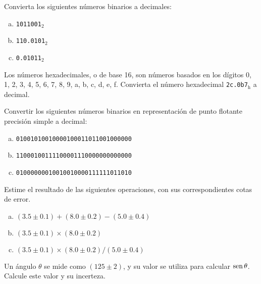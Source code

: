 \documentclass[11pt]{article}
\begin{document}
\begin{question} %
Convierta los siguientes números binarios a decimales:
\begin{enumerate}[a)]
    \item \texttt{1011001}$_2$
    \item \texttt{110.0101}$_2$
    \item \texttt{0.01011}$_2$
\end{enumerate}
\end{question}

\begin{question} %
    Los números hexadecimales, o de base 16, son números basados en los dígitos 0, 1, 2, 3, 4, 5, 6, 7, 8, 9, a, b, c, d, e, f. Convierta el número hexadecimal \texttt{2c.0b7}$_{\text{h}}$ a decimal.
\end{question}

\begin{question}
Convertir los siguientes números binarios en representación de punto flotante precisión simple a decimal: 
\begin{enumerate}[a)]
    \item \texttt{01001010010000100011011001000000} %
    \item \texttt{11000100111100001110000000000000} %
    \item \texttt{01000000010010010000111111011010} %
\end{enumerate}
\end{question}

\begin{question}
Estime el resultado de las siguientes operaciones, con sus correspondientes cotas de error.
\begin{enumerate}[a)]
    \item $(3.5 \pm 0.1) + (8.0 \pm 0.2) - (5.0 \pm 0.4)$
    \item $(3.5 \pm 0.1) \times (8.0 \pm 0.2) $
    \item $(3.5 \pm 0.1) \times (8.0 \pm 0.2) / (5.0 \pm 0.4)$
\end{enumerate}
\end{question}

\begin{question} %
Un ángulo $\theta$ se mide como $(125 \pm 2)$\textdegree, y su valor se utiliza para calcular $\operatorname{sen} \theta$. Calcule este valor y su incerteza.
\end{question}
\end{document}

